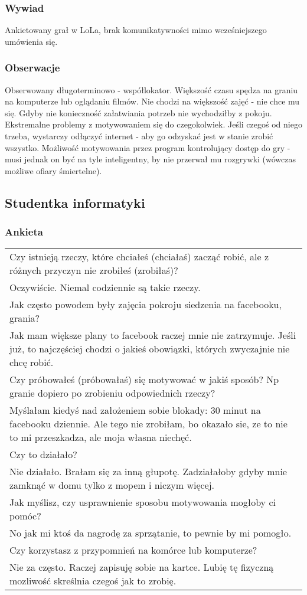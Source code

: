 \documentclass[11pt,wide]{mwart}
\newcommand{\Ta}[1]{
  \begin{tabular}{| p{0.9\textwidth} |}
    \hline
    #1
    \hline
  \end{tabular}
 }
\begin{document}
\subsubsection{Wywiad}
Ankietowany grał w LoLa, brak komunikatywności mimo wcześniejszego umówienia się.
\subsubsection{Obserwacje}
Obserwowany długoterminowo - współlokator. Większość czasu spędza na graniu na komputerze lub oglądaniu filmów. Nie chodzi na większość zajęć - nie chce mu się. Gdyby nie konieczność załatwiania potrzeb nie wychodziłby z pokoju. Ekstremalne problemy z motywowaniem się do czegokolwiek. Jeśli czegoś od niego trzeba, wystarczy odłączyć internet - aby go odzyskać jest w stanie zrobić wszystko. Możliwość motywowania przez program kontrolujący dostęp do gry - musi jednak on być na tyle inteligentny, by nie przerwał mu rozgrywki (wówczas możliwe ofiary śmiertelne).
\subsection{Studentka informatyki}
\subsubsection{Ankieta}
\Ta{
\noindent Czy istnieją rzeczy, które chciałeś (chciałaś) zacząć robić, ale z różnych przyczyn nie zrobiłeś (zrobiłaś)?\\
\indent Oczywiście. Niemal codziennie są takie rzeczy. \\
Jak często powodem były zajęcia pokroju siedzenia na facebooku, grania?\\
\indent Jak mam większe plany to facebook raczej mnie nie zatrzymuje. Jeśli już, to najczęściej chodzi o jakieś obowiązki, których zwyczajnie nie chcę robić.\\
Czy próbowałeś (próbowałaś) się motywować w jakiś sposób? Np granie dopiero po zrobieniu odpowiednich rzeczy?\\
\indent Myślałam kiedyś nad założeniem sobie blokady: 30 minut na facebooku dziennie. Ale tego nie zrobiłam, bo okazało sie, ze to nie to mi przeszkadza, ale moja własna niechęć. \\
Czy to działało?\\
\indent Nie działało. Brałam się za inną głupotę. Zadziałałoby gdyby mnie zamknąć w domu tylko z mopem i niczym więcej.\\
Jak myślisz, czy usprawnienie sposobu motywowania mogłoby ci pomóc?\\
\indent No jak mi ktoś da nagrodę za sprzątanie, to pewnie by mi pomogło.\\
Czy korzystasz z przypomnień na komórce lub komputerze?\\
\indent Nie za często. Raczej zapisuję sobie na kartce. Lubię tę fizyczną mozliwość skreślnia czegoś jak to zrobię.\\}
\end{document}
